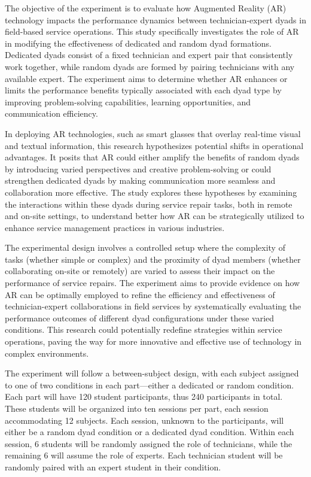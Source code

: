 \documentclass[A4,11pt]{article}
\begin{document}
The objective of the experiment is to evaluate how Augmented Reality (AR) technology impacts the performance dynamics between technician-expert dyads in field-based service operations. This study specifically investigates the role of AR in modifying the effectiveness of dedicated and random dyad formations. Dedicated dyads consist of a fixed technician and expert pair that consistently work together, while random dyads are formed by pairing technicians with any available expert. The experiment aims to determine whether AR enhances or limits the performance benefits typically associated with each dyad type by improving problem-solving capabilities, learning opportunities, and communication efficiency.

In deploying AR technologies, such as smart glasses that overlay real-time visual and textual information, this research hypothesizes potential shifts in operational advantages. It posits that AR could either amplify the benefits of random dyads by introducing varied perspectives and creative problem-solving or could strengthen dedicated dyads by making communication more seamless and collaboration more effective. The study explores these hypotheses by examining the interactions within these dyads during service repair tasks, both in remote and on-site settings, to understand better how AR can be strategically utilized to enhance service management practices in various industries.

The experimental design involves a controlled setup where the complexity of tasks (whether simple or complex) and the proximity of dyad members (whether collaborating on-site or remotely) are varied to assess their impact on the performance of service repairs. The experiment aims to provide evidence on how AR can be optimally employed to refine the efficiency and effectiveness of technician-expert collaborations in field services by systematically evaluating the performance outcomes of different dyad configurations under these varied conditions. This research could potentially redefine strategies within service operations, paving the way for more innovative and effective use of technology in complex environments.

The experiment will follow a between-subject design, with each subject assigned to one of two conditions in each part---either a dedicated or random condition. Each part will have 120 student participants, thus 240 participants in total. These students will be organized into ten sessions per part, each session accommodating 12 subjects. Each session, unknown to the participants, will either be a random dyad condition or a dedicated dyad condition. Within each session, 6 students will be randomly assigned the role of technicians, while the remaining 6 will assume the role of experts. Each technician student will be randomly paired with an expert student in their condition.
\end{document}
